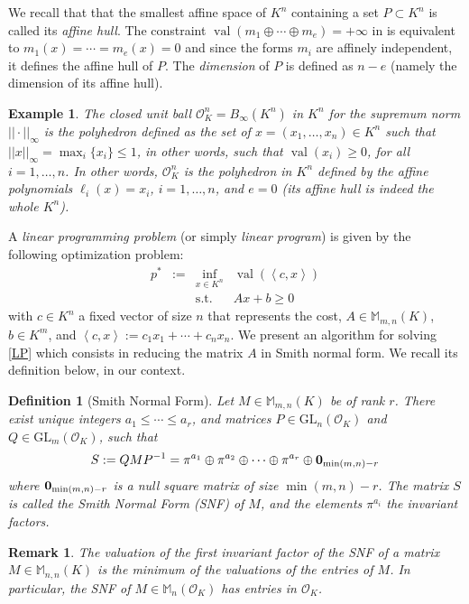 \documentclass[a4paper,12pt]{article}
\newtheorem{definition}{Definition}
\newtheorem{remark}{Remark}
\newtheorem{example}{Example}
\newcommand{\allmat}{\mathbb{M}} %
\DeclareMathOperator{\val}{val}
\newcommand{\OK}{\mathcal{O}_K}
\newcommand{\GL}{\mathrm{GL}}
\begin{document}
We recall that that the smallest affine space of $K^n$ containing a set $P \subset K^n$ is called its
\emph{affine hull}. The constraint $\val(m_1 \oplus \cdots \oplus m_e) = +\infty$ in 
is equivalent to $m_1(x) = \cdots = m_e(x) = 0$ and since the forms $m_i$ are affinely independent, it
defines the affine hull of $P$. The \emph{dimension} of $P$ is defined as $n-e$ (namely the dimension of
its affine hull).

\begin{example}
  The \emph{closed unit ball} $\OK^n=B_\infty(K^n)$ in $K^n$ for the supremum norm $||\cdot||_{\infty}$ is the
  polyhedron defined as the set of $x=(x_1,\ldots,x_n) \in K^n$ such that $||x||_{\infty} =
  \max_i\{x_i\} \leq 1$, in other words, such that $\val(x_i) \geq 0$, for all $i=1, \ldots, n$.
  In other words, $\OK^n$ is the polyhedron in $K^n$ defined by the affine polynomials
  $\ell_i(x)=x_i$, $i=1,\ldots, n$, and $e=0$ (its affine hull is indeed the whole $K^n$).
\end{example}

A \emph{linear programming problem} (or simply \emph{linear program}) is given by the following
optimization problem:
\begin{equation}
  \tag{LP}\label{LP}
\begin{array}{rcll}
  p^* & := & \inf_{x \in K^n} & \val(\left\langle c, x \right\rangle) \\
  &    & \text{s.t.}         & A x + b \geq 0
\end{array}
\end{equation}
with $c \in K^n$ a fixed vector of size $n$ that represents the cost, $A \in \allmat_{m,n}(K)$, $b \in K^m$,
and $\left\langle c, x \right\rangle := c_1x_1+\cdots +c_nx_n$.
We present an algorithm for solving \eqref{LP} which consists in reducing the matrix $A$ in Smith normal form.
We recall its definition below, in our context.

\begin{definition}[Smith Normal Form]\label{smith_nf}
  Let $M \in \allmat_{m,n}(K)$ be of rank $r$. There exist unique integers $a_1 \leq \cdots \leq a_r$, and
  matrices $P \in \GL_n(\OK)$ and $Q \in \GL_m(\OK)$, such that
  $$
  S := QMP^{-1} = \pi^{a_1} \oplus \pi^{a_2} \oplus \cdots \oplus \pi^{a_r} \oplus {\bf 0}_{\min(m,n)-r}
  $$
  where ${\bf 0}_{\min(m,n)-r}$ is a null square matrix of size $\min(m,n)-r$.
  The matrix $S$ is called the \emph{Smith Normal Form (SNF)} of $M$, and the elements $\pi^{a_i}$ the
  \emph{invariant factors}.
\end{definition}
\begin{remark}
  The valuation of the first invariant factor of the SNF of a matrix
  $M \in \allmat_{n,n}(K)$ is the minimum of the valuations of the entries of
  $M$. In particular, the SNF of $M \in \allmat_n(\OK)$ has entries in $\OK$.
\end{remark}
\end{document}
